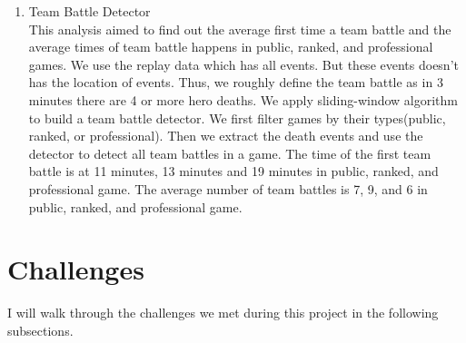 \documentclass{article}
\begin{document}
\begin{enumerate}
    \item Team Battle Detector\\
    This analysis aimed to find out the average first time a team battle and the average times of team battle happens in public, ranked, and professional games. We use the replay data which has all events. But these events doesn't has the location of events. Thus, we roughly define the team battle as in 3 minutes there are 4 or more hero deaths. We apply sliding-window algorithm to build a team battle detector. We first filter games by their types(public, ranked, or professional). Then we extract the death events and use the detector to detect all team battles in a game. The time of the first team battle is at 11 minutes, 13 minutes and 19 minutes in public, ranked, and professional game. The average number of team battles is 7, 9, and 6 in public, ranked, and professional game.

\end{enumerate}
\section{Challenges}
I will walk through the challenges we met during this project in the following subsections.
\end{document}
